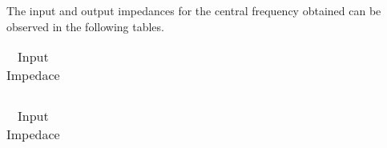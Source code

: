 %    


%    


The input and output impedances for the central frequency obtained can be observed in the following tables.

%    

%    










\begin{table}[!htb]


\parbox{.45\linewidth}{
  \centering
  \begin{tabular}{|l|l|}
    \hline    
    
  \end{tabular}
  \caption{Output Impedace}
}

\hfill
\parbox{.45\linewidth}{
  \centering
  \begin{tabular}{|l|l|}
    \hline    
    
  \end{tabular}
  \caption{Input Impedace}
}

\end{table}














